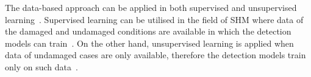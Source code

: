 The data-based approach can be applied in both supervised and unsupervised learning~\cite{worden2007application}.
Supervised learning can be utilised in the field of SHM where data of the damaged and undamaged conditions are available in which the detection models can train~\cite{figueiredo2018machine}.
On the other hand, unsupervised learning is applied when data of undamaged cases are only available, therefore the detection models train only on such data~\cite{figueiredo2018machine}.







